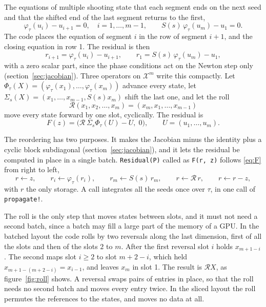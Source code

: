 \documentclass[11pt,a4paper]{article}
\newcommand{\X}{\mathcal{X}}
\newcommand{\roll}{\mathcal{R}}
\newcommand{\code}[1]{\texttt{#1}}
\begin{document}
The equations of multiple shooting state that each segment ends on the next seed and that the
shifted end of the last segment returns to the first,
\begin{equation}
  \varphi_\tau(u_i) - u_{i+1} = 0, \quad i = 1, \dots, m-1, \qquad
  S(s)\,\varphi_\tau(u_m) - u_1 = 0 .
\end{equation}
The code places the equation of segment $i$ in the row of segment $i+1$, and the closing equation
in row 1. The residual is then
\begin{equation}
  r_{i+1} = \varphi_\tau(u_i) - u_{i+1}, \qquad r_1 = S(s)\,\varphi_\tau(u_m) - u_1,
  \label{eq:residual}
\end{equation}
with a zero scalar part, since the phase conditions act on the Newton step only
(section~\ref{sec:jacobian}). Three operators on $\X^m$ write this compactly. Let
$\Phi_\tau(X) = (\varphi_\tau(x_1), \dots, \varphi_\tau(x_m))$ advance every state, let
$\Sigma_s(X) = (x_1, \dots, x_{m-1}, S(s)x_m)$ shift the last one, and let the roll
\begin{equation}
  \roll(x_1, x_2, \dots, x_m) = (x_m, x_1, \dots, x_{m-1})
\end{equation}
move every state forward by one slot, cyclically. The residual is
\begin{equation}
  F(z) = \big(\roll\, \Sigma_s \Phi_\tau(U) - U,\; 0\big), \qquad U = (u_1, \dots, u_m).
  \label{eq:F}
\end{equation}

The reordering has two purposes. It makes the Jacobian minus the identity plus a cyclic block
subdiagonal (section~\ref{sec:jacobian}), and it lets the residual be computed in place in a
single batch. \code{Residual(P)} called as \code{F(r, z)} follows \eqref{eq:F} from right to left,
\begin{equation}
  r \leftarrow z, \qquad
  r_i \leftarrow \varphi_\tau(r_i), \qquad
  r_m \leftarrow S(s)\, r_m, \qquad
  r \leftarrow \roll\, r, \qquad
  r \leftarrow r - z ,
\end{equation}
with $r$ the only storage. A call integrates all the seeds once over $\tau$, in one call of
\code{propagate!}.

The roll is the only step that moves states between slots, and it must not need a second batch,
since a batch may fill a large part of the memory of a GPU. In the batched layout the code rolls
by two reversals along the last dimension, first of all the slots and then of the slots $2$ to
$m$. After the first reversal slot $i$ holds $x_{m+1-i}$. The second maps slot $i \geq 2$ to slot
$m + 2 - i$, which held $x_{m+1-(m+2-i)} = x_{i-1}$, and leaves $x_m$ in slot 1. The result is
$\roll X$, as figure~\ref{fig:roll} shows. A reversal swaps pairs of entries in place, so that the roll
needs no second batch and moves every entry twice. In the sliced layout
the roll permutes the references to the states, and moves no data at all.
\end{document}

